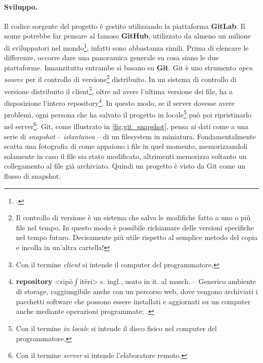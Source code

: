 \documentclass[./main.tex]{subfiles}
\begin{document}
\paragraph{Sviluppo.}
Il codice sorgente del progetto è gestito utilizzando la piattaforma \textbf{GitLab}. Il nome potrebbe far pensare al famoso \textbf{GitHub}, utilizzato da almeno un milione di sviluppatori nel mondo\footcite[\url{https://github.blog/2023-01-25-100-million-developers-and-counting/}]{website-github-100-million-developers}, infatti sono abbastanza simili. Prima di elencare le differenze, occorre dare una panoramica generale su cosa siano le due piattaforme. Innanzitutto entrambe si basano su \textbf{Git}. Git è uno strumento \textit{open source} per il controllo di versione\footnote{Il controllo di versione è un sistema che salva le modifiche fatto a uno o più file nel tempo. In questo modo è possibile richiamare delle versioni specifiche nel tempo futuro. Decisamente più utile rispetto al semplice metodo del copia e incolla in un'altra cartella!} distribuito. In un sistema di controllo di versione distribuito il client\footnote{Con il termine \textit{client} si intende il computer del programmatore.}, oltre ad avere l'ultima versione dei file, ha a disposizione l'intero repository\footnote{\textbf{repository} <ripò$\int$itëri> s. ingl., usato in it. al masch. – Generico ambiente di storage, raggiungibile anche con un percorso web, dove vengono archiviati i pacchetti software che possono essere installati e aggiornati su un computer anche mediante operazioni programmate; \cite{treccani-repository}.}. In questo modo, se il server dovesse avere problemi, ogni persona che ha salvato il progetto in locale\footnote{Con il termine \textit{in locale} si intende il disco fisico nel computer del programmatore.} può poi ripristinarlo nel server\footnote{Con il termine \textit{server} si intende l'elaboratore remoto.}. Git, come illustrato in \autoref{fig:git_snapshot}, pensa ai dati come a una serie di \textit{snapshot} -- \textit{istantanea} -- di un filesystem in miniatura. Fondamentalmente scatta una fotografia di come appaiono i file in quel momento, memorizzandoli solamente in caso il file sia stato modificato, altrimenti memorizza soltanto un collegamento al file già archiviato. Quindi un progetto è visto da Git come un flusso di snapshot.
\end{document}
